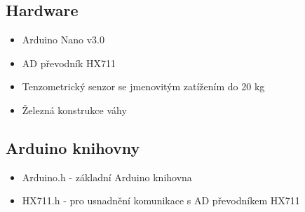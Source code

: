 \subsection*{Hardware}
\begin{itemize}
    \item Arduino Nano v3.0
    \item AD převodník HX711
    \item Tenzometrický senzor se jmenovitým zatížením do 20 kg
    \item Železná konstrukce váhy
\end{itemize}

\subsection*{Arduino knihovny}
\begin{itemize}
    \item Arduino.h - základní Arduino knihovna
    \item HX711.h - pro usnadnění komunikace s AD převodníkem HX711
\end{itemize}




